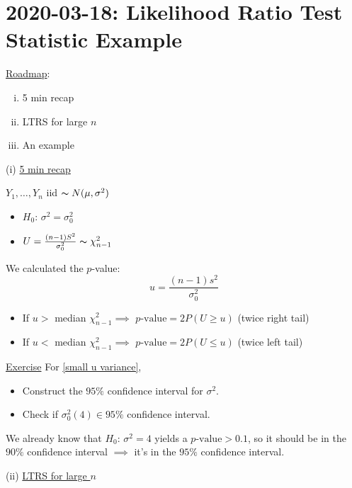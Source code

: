 \section{2020-03-18: Likelihood Ratio Test Statistic Example}
\underline{Roadmap}:
\begin{enumerate}[(i)]
    \item 5 min recap
    \item LTRS for large $ n $
    \item An example
\end{enumerate}

(i) \underline{5 min recap}

$ Y_1,\ldots ,Y_n $ iid $ \thicksim N(\mu,\sigma^2) $
\begin{itemize}
    \item $ H_0 $: $ \sigma^2=\sigma_0^2 $
    \item $ U=\frac{(n-1)S^2}{\sigma_0^2} \thicksim \chi^2_{n-1} $
\end{itemize}
We calculated the $ p $-value:
\[ u=\frac{(n-1)s^2}{\sigma_0^2}  \]
\begin{itemize}
    \item If $ u > $ median $ \chi^2_{n-1} \implies $ $ p\text{-value}=2P(U\geqslant u) $ (twice right tail)
    \item If $ u < $ median $ \chi^2_{n-1} \implies $ $ p\text{-value}=2P(U\leqslant u) $ (twice left tail)
\end{itemize}
\underline{Exercise} For \ref{small u variance},
\begin{itemize}
    \item Construct the $ 95\% $ confidence interval for $ \sigma^2 $.
    \item Check if $ \sigma_0^2(4)\in 95\% $ confidence interval.
\end{itemize}
We already know that $ H_0 $: $ \sigma^2=4 $ yields a $ p\text{-value}>0.1 $, so it should
be in the $ 90\% $ confidence interval $ \implies $ it's in the $ 95\% $ confidence interval.

(ii) \underline{LTRS for large $ n $}


